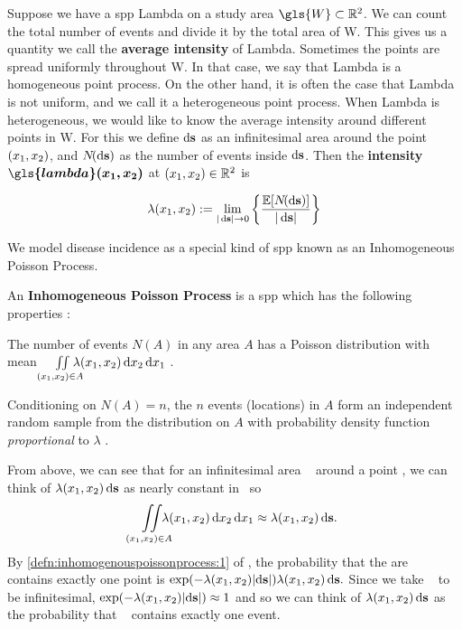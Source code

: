 Suppose we have a \gls{spp} \gls{Lambda} on a study area $\gls{W} \subset \RS$.
We can count the total number of \glspl{event} and divide it by the total area of \gls{W}.
This gives us a quantity we call the \textbf{average \gls{intensity}} of \gls{Lambda}.
Sometimes the points are spread uniformly throughout \gls{W}.
In that case, we say that \gls{Lambda} is a homogeneous point process.
On the other hand, it is often the case that \gls{Lambda} is not uniform,
and we call it a heterogeneous point process.
When \gls{Lambda} is heterogeneous,
we would like to know the average \gls{intensity} around different points in \gls{W}.
For this
we define $\mathop{}\!\mathrm{d}{\mathbf{s}}$ as an infinitesimal area around the point $(x_1, x_2)$,
and $N\!(\mathop{}\!\mathrm{d}{\mathbf{s}})$ as the number of \glspl{event} inside $\mathop{}\!\mathrm{d}{\mathbf{s}}$.
Then the \textbf{\gls{intensity}} $\boldsymbol{\gls{lambda}\xvec}$ at $(x_1, x_2) \in \mathbb{R}^2$ is

\begin{equation}
    \label{eq:lambda_differential}
    \lambda \xvec := \lim_{|\ds| \to 0}
        \left\{
            \frac{\mathbb{E}[N\!(\ds)]}%
            {|\ds|}
        \right\}
\end{equation}

We model disease incidence as a special kind of \gls{spp} known as an Inhomogeneous Poisson Process.
\begin{defn}
    \label{defn:inhomogenouspoissonprocess}
    An \textbf{Inhomogeneous Poisson Process} is a \gls{spp} which has the following properties \citep[Section 4.4]{diggle1983spatial}:
    \begin{properties}
        \item The number of events $N\!(A)$ in any area $A$ has a Poisson distribution with mean
            $\iint\limits_{(x_1, x_2) \in A}{\hspace{-1em} \lambda (x_1, x_2) \mathop{}\!\mathrm{d}{x_2} \mathop{}\!\mathrm{d}{x_1}}$
            \label{defn:inhomogenouspoissonprocess:1}.
        \item Conditioning on $N\!(A) \! = \! n$,
            the $n$ events (locations) in $A$ form an independent random sample from the distribution on $A$ with probability density function \textit{proportional} to $\lambda$ \label{defn:inhomogenouspoissonprocess:2}.
    \end{properties}
\end{defn}

From above, we can see that for an infinitesimal area \ds~ around a point \xvec,
we can think of $\lambda (x_1, x_2) \mathop{}\!\mathrm{d}{\mathbf{s}}$ as nearly constant in \ds~so
$$\iint\limits_{(x_1, x_2) \in A}{\hspace{-1em}\lambda (x_1, x_2) \mathop{}\!\mathrm{d}{x_2} \mathop{}\!\mathrm{d}{x_1}} \approx \lambda (x_1, x_2) \mathop{}\!\mathrm{d}{\mathbf{s}} \text{.}$$
By \cref{defn:inhomogenouspoissonprocess:1} of ,
the probability that the are \ds~ contains exactly one point is
$\exp(-\lambda (x_1, x_2) |\!\mathop{}\!\mathrm{d}{\mathbf{s}}|) \lambda (x_1, x_2) \mathop{}\!\mathrm{d}{\mathbf{s}} \text{.}$
Since we take \ds~ to be infinitesimal,
$\exp(-\lambda (x_1, x_2) |\!\mathop{}\!\mathrm{d}{\mathbf{s}}|) \allowbreak \approx 1$ and so we can think of
$\lambda (x_1, x_2) \mathop{}\!\mathrm{d}{\mathbf{s}}$ as the probability that \ds~ contains exactly one event.

